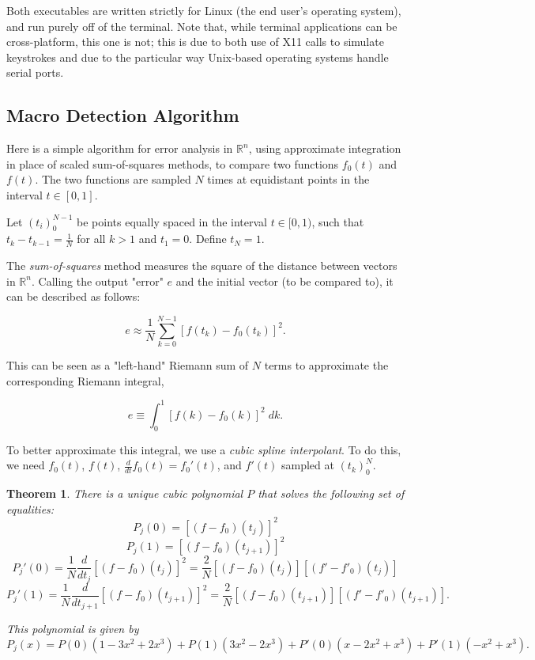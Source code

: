 \documentclass{article}
\newtheorem{theorem}{Theorem}
\begin{document}
	Both executables are written strictly for Linux (the end user's operating system), and run purely off of the terminal. Note that, while terminal applications can be cross-platform, this one is not; this is due to both use of X11 calls to simulate keystrokes and due to the particular way Unix-based operating systems handle serial ports.
	\subsection*{Macro Detection Algorithm}
	
	Here is a simple algorithm for error analysis in $\mathbb{R}^n$, using approximate integration in place of scaled sum-of-squares methods, to compare two functions $f_0(t)$ and $f(t)$. The two functions are sampled $N$ times at equidistant points in the interval $t\in[0,1]$.
	
	Let $(t_i)_0^{N-1}$ be points equally spaced in the interval $t\in[0,1)$, such that $t_k-t_{k-1}=\frac{1}{N}$ for all $k>1$ and $t_1=0$. Define $t_{N}=1$. 
	
	The \emph{sum-of-squares} method measures the square of the distance between vectors in $\mathbb{R}^n$. Calling the output "error" $e$ and the initial vector (to be compared to), it can be described as follows:
	
	$$ e \approx \frac{1}{N}\sum\limits_{k=0}^{N-1} [f(t_k)-f_0(t_k)]^2 .$$
	
	This can be seen as a "left-hand" Riemann sum of $N$ terms to approximate the corresponding Riemann integral,
	
	$$e \equiv \int_0^1 [f(k)-f_0(k)]^2\;dk.$$
	
	To better approximate this integral, we use a \emph{cubic spline interpolant}. To do this, we need $f_0(t)$, $f(t)$, $\frac{d}{dt}f_0(t)=f_0'(t)$, and $f'(t)$ sampled at $(t_k)_0^N$.
	
	\begin{theorem}
		There is a unique cubic polynomial $P$ that solves the following set of equalities:
		$$P_j(0)=[(f-f_0)(t_j)]^2$$
		$$P_j(1)=[(f-f_0)(t_{j+1})]^2$$
		$$P_j'(0)=\frac{1}{N}\frac{d}{dt_j}[(f-f_0)(t_j)]^2=\frac{2}{N}[(f-f_0)(t_j)][(f'-f'_0)(t_j)]$$
		$$P_j'(1)=\frac{1}{N}\frac{d}{dt_{j+1}}[(f-f_0)(t_{j+1})]^2=\frac{2}{N}[(f-f_0)(t_{j+1})][(f'-f'_0)(t_{j+1})].$$
		
		This polynomial is given by 
		$$P_j(x)=P(0)(1-3x^2+2x^3)+P(1)(3x^2-2x^3)+P'(0)(x-2x^2+x^3)+P'(1)(-x^2+x^3).$$
	\end{theorem}
	
\end{document}
